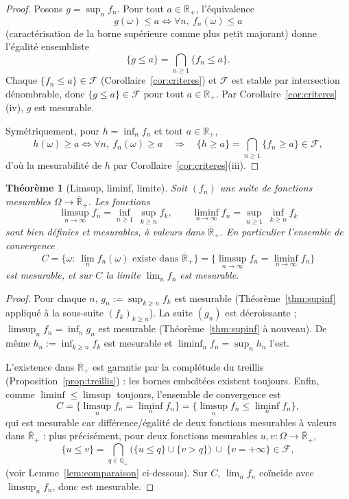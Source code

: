 \documentclass[11pt,a4paper]{article}
\theoremstyle{plain}
\newtheorem{theorem}{Théorème}[section]
\theoremstyle{definition}
\newcommand{\Q}{\mathbb{Q}}
\newcommand{\Rp}{\mathbb{R}_+}
\newcommand{\Rpb}{\overline{\mathbb{R}}_+}
\newcommand{\F}{\mathcal{F}}
\newcommand{\limsupn}{\limsup_{n\to\infty}}
\newcommand{\liminfn}{\liminf_{n\to\infty}}
\begin{document}
\begin{proof}
Posons $g=\sup_n f_n$. Pour tout $a\in\Rp$, l'équivalence
\[
g(\omega)\le a\iff \forall n,\ f_n(\omega)\le a
\]
(caractérisation de la borne supérieure comme plus petit majorant) donne
l'égalité ensembliste
\[
\{g\le a\}=\bigcap_{n\ge1}\{f_n\le a\}.
\]
Chaque $\{f_n\le a\}\in\F$ (Corollaire~\ref{cor:criteres}) et $\F$ est stable
par intersection dénombrable, donc $\{g\le a\}\in\F$ pour tout $a\in\Rp$. Par
Corollaire~\ref{cor:criteres}(iv), $g$ est mesurable.

Symétriquement, pour $h=\inf_n f_n$ et tout $a\in\Rp$,
\[
h(\omega)\ge a\iff\forall n,\ f_n(\omega)\ge a
\quad\Longrightarrow\quad
\{h\ge a\}=\bigcap_{n\ge1}\{f_n\ge a\}\in\F,
\]
d'où la mesurabilité de $h$ par Corollaire~\ref{cor:criteres}(iii).
\end{proof}

\begin{theorem}[Limsup, liminf, limite]\label{thm:limsup}
Soit $(f_n)$ une suite de fonctions mesurables $\Omega\to\Rpb$. Les fonctions
\[
\limsupn f_n=\inf_{n\ge1}\ \sup_{k\ge n} f_k,\qquad
\liminfn f_n=\sup_{n\ge1}\ \inf_{k\ge n} f_k
\]
sont bien définies et mesurables, à valeurs dans $\Rpb$. En particulier
l'ensemble de convergence
\[
C=\Big\{\omega:\ \lim_n f_n(\omega)\text{ existe dans }\Rpb\Big\}
=\Big\{\limsupn f_n=\liminfn f_n\Big\}
\]
est mesurable, et sur $C$ la limite $\lim_n f_n$ est mesurable.
\end{theorem}

\begin{proof}
Pour chaque $n$, $g_n:=\sup_{k\ge n} f_k$ est mesurable
(Théorème~\ref{thm:supinf} appliqué à la sous-suite $(f_k)_{k\ge n}$). La suite
$(g_n)$ est décroissante ; $\limsup_n f_n=\inf_n g_n$ est mesurable
(Théorème~\ref{thm:supinf} à nouveau). De même
$h_n:=\inf_{k\ge n}f_k$ est mesurable et $\liminf_n f_n=\sup_n h_n$ l'est.

L'existence dans $\Rpb$ est garantie par la complétude du treillis
(Proposition~\ref{prop:treillis}) : les bornes emboîtées existent toujours.
Enfin, comme $\liminf\le\limsup$ toujours, l'ensemble de convergence est
\[
C=\{\limsup_n f_n=\liminf_n f_n\}
=\{\limsup_n f_n\le\liminf_n f_n\},
\]
qui est mesurable car différence/égalité de deux fonctions mesurables à valeurs
dans $\Rpb$ : plus précisément, pour deux fonctions mesurables $u,v:\Omega\to\Rpb$,
\[
\{u\le v\}=\bigcap_{q\in\Q_+}\big(\{u\le q\}\cup\{v> q\}\big)\ \cup\ \{v=+\infty\}
\in\F,
\]
(voir Lemme~\ref{lem:comparaison} ci-dessous). Sur $C$, $\lim_n f_n$ coïncide
avec $\limsup_n f_n$, donc est mesurable.
\end{proof}
\end{document}
